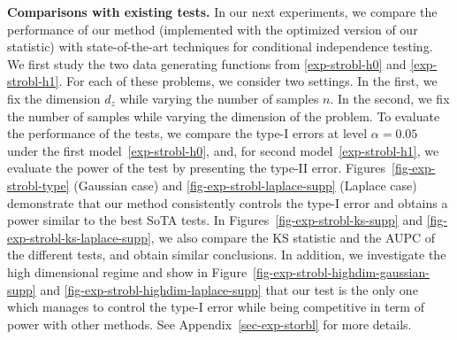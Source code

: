 \textbf{Comparisons with existing tests.} In our next experiments, we compare the performance of our method (implemented with the optimized version of our statistic) with state-of-the-art techniques for conditional independence testing. We first study the two data generating functions from \eqref{exp-strobl-h0} and \eqref{exp-strobl-h1}. For each of these problems, we consider two settings. In the first, we fix the dimension $d_z$ while varying the number of samples $n$. In the second, we fix the number of samples while varying the dimension of the problem. To evaluate the performance of the tests, we compare the type-I errors at level $\alpha=0.05$ under the first model~\eqref{exp-strobl-h0}, and, for second model~\eqref{exp-strobl-h1}, we evaluate the power of the test by presenting the type-II error. Figures~\ref{fig-exp-strobl-type} (Gaussian case) and \ref{fig-exp-strobl-laplace-supp} (Laplace case) demonstrate that our method consistently controls the type-I error and obtains a power similar to the best SoTA tests. In Figures~\ref{fig-exp-strobl-ks-supp} and \ref{fig-exp-strobl-ks-laplace-supp}, we also compare the KS statistic and the AUPC of the different tests, and obtain similar conclusions. In addition, we investigate the high dimensional regime and show in Figure~\ref{fig-exp-strobl-highdim-gaussian-supp} and \ref{fig-exp-strobl-highdim-laplace-supp} that our test is the only one which manages to control the type-I error while being competitive in term of power with other methods. See Appendix~\ref{sec-exp-storbl} for more details. 


